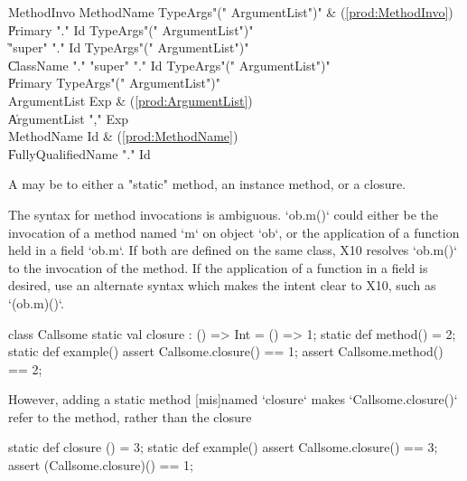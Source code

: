 \begin{bbgrammar}
          MethodInvo \: MethodName TypeArgs\opt \xcd"(" ArgumentList\opt \xcd")" & (\ref{prod:MethodInvo}) \\
                     \| Primary \xcd"." Id TypeArgs\opt \xcd"(" ArgumentList\opt \xcd")" \\
                     \| \xcd"super" \xcd"." Id TypeArgs\opt \xcd"(" ArgumentList\opt \xcd")" \\
                     \| ClassName \xcd"." \xcd"super"  \xcd"." Id TypeArgs\opt \xcd"(" ArgumentList\opt \xcd")" \\
                     \| Primary TypeArgs\opt \xcd"(" ArgumentList\opt \xcd")" \\
        ArgumentList \: Exp & (\ref{prod:ArgumentList}) \\
                     \| ArgumentList \xcd"," Exp \\
          MethodName \: Id & (\ref{prod:MethodName}) \\
                     \| FullyQualifiedName \xcd"." Id \\
\end{bbgrammar}


A  may be to either a \xcd"static" method, an
instance method, or a closure.


The syntax for method invocations is ambiguous. \xcd`ob.m()` could either be
the invocation of a method named \xcd`m` on object \xcd`ob`, or the
application of a function held in a field \xcd`ob.m`.   If both are defined on
the same class, X10 resolves \xcd`ob.m()` to the invocation of the 
method.  If the application of a function in a field is desired, use
an alternate syntax which makes the intent clear to X10, such as
\xcd`(ob.m)()`. 

\begin{ex}
\begin{xten}
class Callsome {
  static val closure : () => Int = () => 1;
  static def method()            = 2;
  static def example() {
     assert Callsome.closure() == 1;
     assert Callsome.method()  == 2;
  } 
}
\end{xten}
However, adding a static method [mis]named \xcd`closure` makes
\xcd`Callsome.closure()` 
refer to the method, rather than the closure
\begin{xten}
  static def closure () = 3;
  static def example() {
     assert Callsome.closure() == 3;
     assert (Callsome.closure)() == 1;
  }
\end{xten}
\end{ex}

